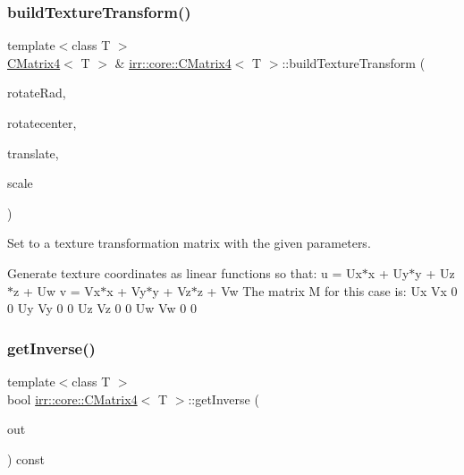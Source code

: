 \subsubsection{\texorpdfstring{build\+Texture\+Transform()}{buildTextureTransform()}}
{\footnotesize\ttfamily template$<$class T $>$ \\
\hyperlink{classirr_1_1core_1_1CMatrix4}{C\+Matrix4}$<$ T $>$ \& \hyperlink{classirr_1_1core_1_1CMatrix4}{irr\+::core\+::\+C\+Matrix4}$<$ T $>$\+::build\+Texture\+Transform (\begin{DoxyParamCaption}\item[{\hyperlink{namespaceirr_a0277be98d67dc26ff93b1a6a1d086b07}{f32}}]{rotate\+Rad,  }\item[{const \hyperlink{namespaceirr_1_1core_a2cf08556d77f6f5a792973a6e27ed11b}{core\+::vector2df} \&}]{rotatecenter,  }\item[{const \hyperlink{namespaceirr_1_1core_a2cf08556d77f6f5a792973a6e27ed11b}{core\+::vector2df} \&}]{translate,  }\item[{const \hyperlink{namespaceirr_1_1core_a2cf08556d77f6f5a792973a6e27ed11b}{core\+::vector2df} \&}]{scale }\end{DoxyParamCaption})\hspace{0.3cm}{\ttfamily [inline]}}



Set to a texture transformation matrix with the given parameters. 

Generate texture coordinates as linear functions so that\+: u = Ux$\ast$x + Uy$\ast$y + Uz$\ast$z + Uw v = Vx$\ast$x + Vy$\ast$y + Vz$\ast$z + Vw The matrix M for this case is\+: Ux Vx 0 0 Uy Vy 0 0 Uz Vz 0 0 Uw Vw 0 0 \mbox{\label{classirr_1_1core_1_1CMatrix4_a323bfa0e327636c9cd4a5d2b781b3a60}} 
\subsubsection{\texorpdfstring{get\+Inverse()}{getInverse()}}
{\footnotesize\ttfamily template$<$class T $>$ \\
bool \hyperlink{classirr_1_1core_1_1CMatrix4}{irr\+::core\+::\+C\+Matrix4}$<$ T $>$\+::get\+Inverse (\begin{DoxyParamCaption}\item[{\hyperlink{classirr_1_1core_1_1CMatrix4}{C\+Matrix4}$<$ T $>$ \&}]{out }\end{DoxyParamCaption}) const\hspace{0.3cm}{\ttfamily [inline]}}



